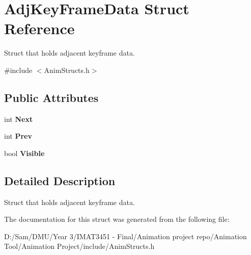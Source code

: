 \hypertarget{struct_adj_key_frame_data}{}\section{Adj\+Key\+Frame\+Data Struct Reference}
\label{struct_adj_key_frame_data}


Struct that holds adjacent keyframe data.  




{\ttfamily \#include $<$Anim\+Structs.\+h$>$}

\subsection*{Public Attributes}
\begin{DoxyCompactItemize}
\item 
\mbox{\label{struct_adj_key_frame_data_adcc624fb8fe7e1efa2b03b69b62cbb11}} 
int {\bfseries Next}
\item 
\mbox{\label{struct_adj_key_frame_data_aacb8e25c9c2db5e6dc1d58656acc8839}} 
int {\bfseries Prev}
\item 
\mbox{\label{struct_adj_key_frame_data_a8353a575cc655e06f4dc2af38be629d2}} 
bool {\bfseries Visible}
\end{DoxyCompactItemize}


\subsection{Detailed Description}
Struct that holds adjacent keyframe data. 

The documentation for this struct was generated from the following file\+:\begin{DoxyCompactItemize}
\item 
D\+:/\+Sam/\+D\+M\+U/\+Year 3/\+I\+M\+A\+T3451 -\/ Final/\+Animation project repo/\+Animation Tool/\+Animation Project/include/Anim\+Structs.\+h\end{DoxyCompactItemize}
